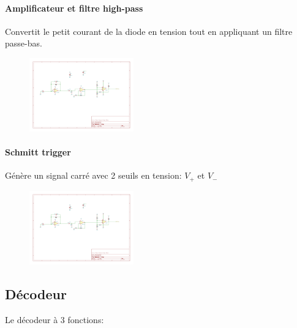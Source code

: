 \documentclass[french]{layout/Report}
\begin{document}
\paragraph{Amplificateur et filtre high-pass}
Convertit le petit courant de la diode en tension tout en appliquant un filtre passe-bas.
\begin{figure}[h]
\centering
\includegraphics[width=0.4\textwidth]{fig/amplifier.pdf}
\end{figure}

\paragraph{Schmitt trigger}
Génère un signal carré avec 2 seuils en tension: $V_+$ et $V_-$
\begin{figure}[h]
\centering
\includegraphics[width=0.4\textwidth]{fig/schmitt_trigger.pdf}
\end{figure}

\subsection{Décodeur}
Le décodeur à 3 fonctions:
\end{document}
